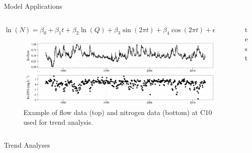 \documentclass[final,t,serif]{beamer}\usepackage[]{graphicx}\usepackage[]{color}
\begin{document}
\begin{frame}{}
\begin{columns}[t]
\begin{column}{.62\linewidth}
\begin{block}{Model Applications}
\begin{columns}
      \begin{column}{0.45\linewidth}
      \small
      \centerline{$\ln\left(N\right) = \beta_0 + \beta_1 t + \beta_2 \ln\left(Q\right) + \beta_3 \sin\left(2\pi t\right) + \beta_4 \cos\left(2\pi t\right) + \epsilon$}
	    \begin{figure}
      \centerline{\includegraphics[width=\linewidth]{posterfigs/rawdat.png}}
      \caption{\footnotesize Example of flow data (top) and nitrogen data (bottom) at C10 used for trend analysis.}
	    \end{figure}		
	    \end{column}
	    
	    \begin{column}{0.45\linewidth}
	    test
	    \end{column}
	    
	    \end{columns}
	    
      \end{block}

      \begin{block}{Trend Analyses}
				
			\end{block}

    \end{column}
 
  \end{columns}

\end{frame}
\end{document}

